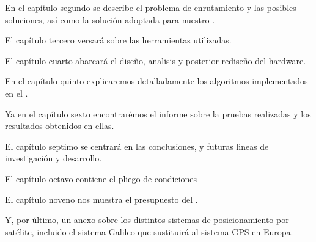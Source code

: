 \par En el capítulo segundo se describe el problema de enrutamiento y las posibles soluciones, así como la solución adoptada para nuestro \bott.
\par El capítulo tercero versará sobre las herramientas utilizadas.
\par El capítulo cuarto abarcará el diseño, analisis y posterior rediseño del hardware.
\par En el capítulo quinto explicaremos detalladamente los algoritmos implementados en el \bott.
\par Ya en el capítulo sexto encontrarémos el informe sobre la pruebas realizadas y los resultados obtenidos en ellas.
\par El capítulo septimo se centrará en las conclusiones, y futuras lineas de investigación y desarrollo.
\par El capítulo octavo contiene el pliego de condiciones
\par El capítulo noveno nos muestra el presupuesto del \bott.
\par Y, por último, un anexo sobre los distintos sistemas de posicionamiento por satélite, incluido el sistema Galileo que sustituirá al sistema GPS en Europa.